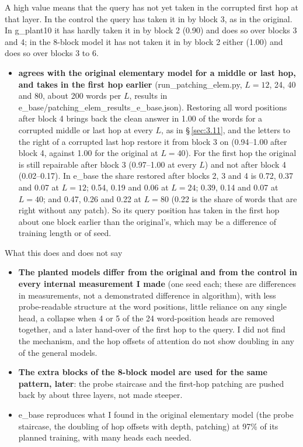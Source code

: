 \documentclass[paper=a4,fontsize=11pt,DIV=11,parskip=half,headings=small,numbers=noendperiod]{scrartcl}
\DeclareRobustCommand{\lead}[1]{\textsf{\bfseries\color{accent}#1}}
\DeclareRobustCommand{\code}[1]{{\fontseries{m}\ttfamily #1}}
\begin{document}
A high value means that the query has not yet taken in the corrupted first hop at that layer. In the control the
query has taken it in by block 3, as in the original. In \code{g\_\allowbreak{}plant10} it has hardly taken it
in by block 2 (0.90) and does so over blocks 3 and 4; in the 8-block model it has not taken it in by block 2
either (1.00) and does so over blocks 3 to 6.

\begin{itemize}
\item \lead{\code{e\_\allowbreak{}base} agrees with the original elementary model for a middle or last hop, and
  takes in the first hop earlier} (\code{run\_\allowbreak{}patching\_\allowbreak{}elem.\allowbreak{}py}, $L=12$,
  24, 40 and 80, about 200 words per $L$, results in
  \code{e\_\allowbreak{}base/\allowbreak{}patching\_\allowbreak{}elem\_\allowbreak{}results\_\allowbreak{}e\_\allowbreak{}base.\allowbreak{}json}).
  Restoring all word positions after block 4 brings back the clean answer in 1.00 of the words for a corrupted
  middle or last hop at every $L$, as in \S\,\ref{sec:3.11}, and the letters to the right of a corrupted last
  hop restore it from block 3 on (0.94–1.00 after block 4, against 1.00 for the original at $L=40$). For the
  first hop the original is still repairable after block 3 (0.97–1.00 at every $L$) and not after block 4
  (0.02–0.17). In \code{e\_\allowbreak{}base} the share restored after blocks 2, 3 and 4 is 0.72, 0.37 and 0.07
  at $L=12$; 0.54, 0.19 and 0.06 at $L=24$; 0.39, 0.14 and 0.07 at $L=40$; and 0.47, 0.26 and 0.22 at $L=80$
  (0.22 is the share of words that are right without any patch). So its query position has taken in the first
  hop about one block earlier than the original’s, which may be a difference of training length or of seed.
\end{itemize}

\begin{findbox}{What this does and does not say}
\begin{itemize}
\item \lead{The planted models differ from the original and from the control in every internal measurement I
  made} (one seed each; these are differences in measurements, not a demonstrated difference in algorithm), with
  less probe-readable structure at the word positions, little reliance on any single head, a collapse when 4 or
  5 of the 24 word-position heads are removed together, and a later hand-over of the first hop to the query. I
  did not find the mechanism, and the hop offsets of attention do not show doubling in any of the general
  models.
\item \lead{The extra blocks of the 8-block model are used for the same pattern, later}: the probe staircase and
  the first-hop patching are pushed back by about three layers, not made steeper.
\item \code{e\_\allowbreak{}base} reproduces what I found in the original elementary model (the probe staircase,
  the doubling of hop offsets with depth, patching) at 97\% of its planned training, with many heads each
  needed.
\end{itemize}
\end{findbox}
\end{document}
